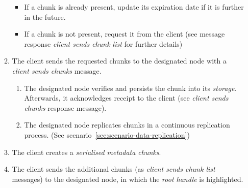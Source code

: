 \begin{enumerate}
\begin{enumerate}
                \begin{itemize}
                    \item If a chunk is already present, update its expiration date if it is further in the future.
                    \item If a chunk is not present, request it from the client (see message response \emph{client sends chunk list} for further details)
                \end{itemize}
            \item The client sends the requested chunks to the designated node with a \emph{client sends chunks} message. %
                \begin{enumerate}
                    \item The designated node verifies and persists the chunk into its \emph{storage}. Afterwards, it acknowledges receipt to the client (see \emph{client sends chunks} response message).
                    \item The designated node replicates chunks in a continuous replication process. (See scenario~\ref{sec:scenario-data-replication})
                \end{enumerate}
            \item The client creates a \emph{serialised metadata chunks}. %
            \item The client sends the additional chunks (as \emph{client sends chunk list} messages) to the designated node, in which the \emph{root handle} is highlighted. %
        \end{enumerate}
\end{enumerate}

